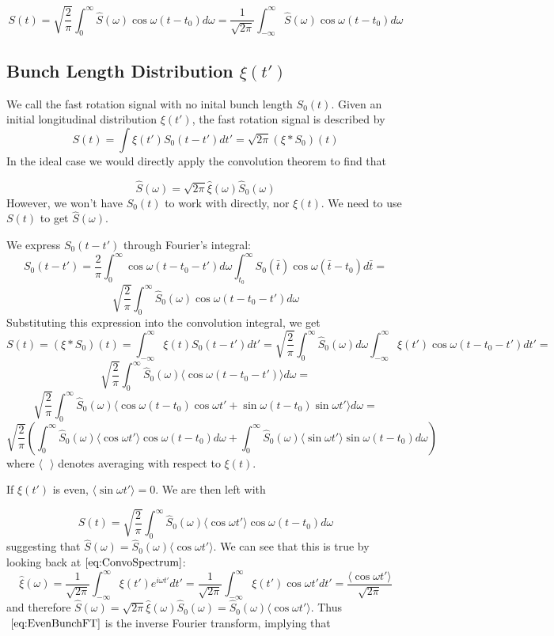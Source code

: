 \begin{equation}
S(t)=\sqrt{\frac{2}{\pi}}\int^{\infty}_0\hat{S}(\omega)\cos\omega(t-t_0)d\omega=\frac{1}{\sqrt{2\pi}}\int^{\infty}_{-\infty}\hat{S}(\omega)\cos\omega(t-t_0)d\omega
\label{eq:nospreadIFT}
\end{equation}

\subsection{Bunch Length Distribution $\xi(t')$}
We call the fast rotation signal with no inital bunch length $S_0(t)$. Given an initial longitudinal distribution $\xi(t')$, the fast rotation signal is described by \[S(t)=\int\xi(t')S_0(t-t')dt'=\sqrt{2\pi}(\xi\ast S_0)(t)\] In the ideal case we would directly apply the convolution theorem to find that 

\begin{equation}
\hat{S}(\omega)=\sqrt{2\pi}\hat{\xi}(\omega)\hat{S}_0(\omega)
\label{eq:ConvoSpectrum}
\end{equation} However, we won't have $S_0(t)$ to work with directly, nor $\xi(t)$. We need to use $S(t)$ to get $\hat{S}(\omega)$. 

We express $S_0(t-t')$ through Fourier's integral: \[S_0(t-t')=\frac{2}{\pi}\int^{\infty}_0\cos\omega(t-t_0-t')d\omega\int^{\infty}_{t_0}S_0(\bar{t})\cos\omega(\bar{t}-t_0)d\bar{t}=\]\[\sqrt{\frac{2}{\pi}}\int^{\infty}_0\hat{S}_0(\omega)\cos\omega(t-t_0-t')d\omega\] Substituting this expression into the convolution integral, we get \[S(t)=(\xi\ast S_0)(t)=\int^{\infty}_{-\infty}\xi(t)S_0(t-t')dt'=\sqrt{\frac{2}{\pi}}\int^{\infty}_0\hat{S}_0(\omega)d\omega\int^{\infty}_{-\infty}\xi(t')\cos\omega(t-t_0-t')dt'=\]\[\sqrt{\frac{2}{\pi}}\int^{\infty}_0\hat{S}_0(\omega)\langle\cos\omega(t-t_0-t')\rangle d\omega=\]\[\sqrt{\frac{2}{\pi}}\int^{\infty}_0\hat{S}_0(\omega)\langle\cos\omega(t-t_0)\cos\omega t'+\sin\omega(t-t_0)\sin\omega t'\rangle d\omega=\]\[\sqrt{\frac{2}{\pi}}\left(\int^{\infty}_0\hat{S}_0(\omega)\langle\cos\omega t'\rangle\cos\omega(t-t_0)d\omega+\int^{\infty}_0\hat{S}_0(\omega)\langle\sin\omega t'\rangle\sin\omega(t-t_0)d\omega\right)\] where $\langle\text{ }\rangle$ denotes averaging with respect to $\xi(t)$. 

If $\xi(t')$ is even, $\langle\sin\omega t'\rangle=0$. We are then left with 

\begin{equation}
S(t)=\sqrt{\frac{2}{\pi}}\int^{\infty}_0\hat{S}_0(\omega)\langle\cos\omega t'\rangle\cos\omega(t-t_0)d\omega
\label{eq:EvenBunchFT}
\end{equation} suggesting that $\hat{S}(\omega)=\hat{S}_0(\omega)\langle\cos\omega t'\rangle$. We can see that this is true by looking back at$~\eqref{eq:ConvoSpectrum}$: \[\hat{\xi}(\omega)=\frac{1}{\sqrt{2\pi}}\int^{\infty}_{-\infty}\xi(t')e^{i\omega t'}dt'=\frac{1}{\sqrt{2\pi}}\int^{\infty}_{-\infty}\xi(t')\cos\omega t'dt'=\frac{\langle\cos\omega t'\rangle}{\sqrt{2\pi}}\] and therefore $\hat{S}(\omega)=\sqrt{2\pi}\hat{\xi}(\omega)\hat{S}_0(\omega)=\hat{S}_0(\omega)\langle\cos\omega t'\rangle$. Thus$~\eqref{eq:EvenBunchFT}$ is the inverse Fourier transform, implying that 


